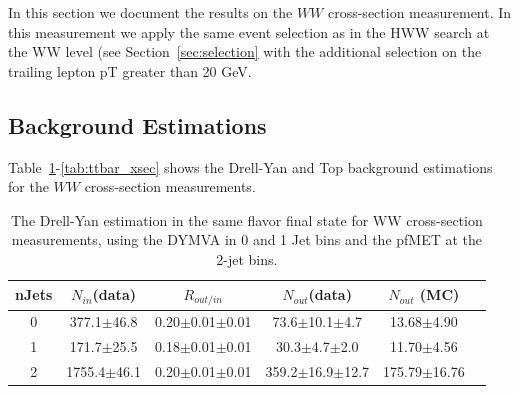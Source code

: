 In this section we document the results on the $WW$ cross-section 
measurement. In this measurement we apply the same event 
selection as in the HWW search at the WW level 
(see Section~\ref{sec:selection}  with the 
additional selection on the trailing lepton pT greater than 20 GeV. 

\subsection{Background Estimations}

Table~\ref{tab:dy_wwxec}-\ref{tab:ttbar_xsec} shows the Drell-Yan and Top 
background estimations for the $WW$ cross-section measurements. 

\begin{table}[ht!]
\begin{center}
\begin{tabular}{c c c c c c}
\hline
       nJets & $N_{in}$(data)        & $R_{out/in}$        & $N_{out}$(data)  & $N_{out}$ (MC) \\ 
\hline
0 & 377.1$\pm$46.8 & 0.20$\pm$0.01$\pm$0.01 & 73.6$\pm$10.1$\pm$4.7 & 13.68$\pm$4.90 \\
1 & 171.7$\pm$25.5 & 0.18$\pm$0.01$\pm$0.01 & 30.3$\pm$4.7$\pm$2.0  & 11.70$\pm$4.56 \\
2 & 1755.4$\pm$46.1 & 0.20$\pm$0.01$\pm$0.01 & 359.2$\pm$16.9$\pm$12.7  & 175.79$\pm$16.76 \\
\hline
\end{tabular}
\caption{The Drell-Yan estimation in the same flavor final state for WW cross-section measurements, 
using the DYMVA in 0 and 1 Jet bins and the pfMET at the 2-jet bins. }
\label{tab:dy_wwxec}
\end{center}
\end{table}


